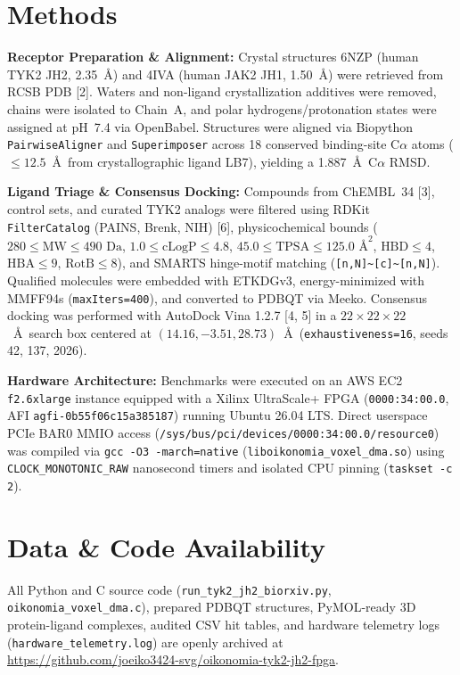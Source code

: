 \documentclass[10pt,letterpaper]{article}
\begin{document}
\section{Methods}
\textbf{Receptor Preparation \& Alignment:} Crystal structures 6NZP (human TYK2 JH2, 2.35~Å) and 4IVA (human JAK2 JH1, 1.50~Å) were retrieved from RCSB PDB [2]. Waters and non-ligand crystallization additives were removed, chains were isolated to Chain~A, and polar hydrogens/protonation states were assigned at pH~7.4 via OpenBabel. Structures were aligned via Biopython \texttt{PairwiseAligner} and \texttt{Superimposer} across 18 conserved binding-site C$\alpha$ atoms ($\le 12.5$~Å\ from crystallographic ligand LB7), yielding a 1.887~Å\ C$\alpha$ RMSD.

\textbf{Ligand Triage \& Consensus Docking:} Compounds from ChEMBL~34 [3], control sets, and curated TYK2 analogs were filtered using RDKit \texttt{FilterCatalog} (PAINS, Brenk, NIH) [6], physicochemical bounds ($280 \le \text{MW} \le 490\text{ Da}$, $1.0 \le \text{cLogP} \le 4.8$, $45.0 \le \text{TPSA} \le 125.0\text{ Å}^2$, $\text{HBD} \le 4$, $\text{HBA} \le 9$, $\text{RotB} \le 8$), and SMARTS hinge-motif matching (\texttt{[n,N]\textasciitilde[c]\textasciitilde[n,N]}). Qualified molecules were embedded with ETKDGv3, energy-minimized with MMFF94s (\texttt{maxIters=400}), and converted to PDBQT via Meeko. Consensus docking was performed with AutoDock Vina 1.2.7 [4, 5] in a $22\times22\times22$~Å\ search box centered at $(14.16, -3.51, 28.73)$~Å\ (\texttt{exhaustiveness=16}, seeds 42, 137, 2026).

\textbf{Hardware Architecture:} Benchmarks were executed on an AWS EC2 \texttt{f2.6xlarge} instance equipped with a Xilinx UltraScale+ FPGA (\texttt{0000:34:00.0}, AFI \texttt{agfi-0b55f06c15a385187}) running Ubuntu 26.04 LTS. Direct userspace PCIe BAR0 MMIO access (\texttt{/sys/bus/pci/devices/0000:34:00.0/resource0}) was compiled via \texttt{gcc -O3 -march=native} (\texttt{liboikonomia\_voxel\_dma.so}) using \texttt{CLOCK\_MONOTONIC\_RAW} nanosecond timers and isolated CPU pinning (\texttt{taskset -c 2}).

\section{Data \& Code Availability}
All Python and C source code (\texttt{run\_tyk2\_jh2\_biorxiv.py}, \texttt{oikonomia\_voxel\_dma.c}), prepared PDBQT structures, PyMOL-ready 3D protein-ligand complexes, audited CSV hit tables, and hardware telemetry logs (\texttt{hardware\_telemetry.log}) are openly archived at \url{https://github.com/joeiko3424-svg/oikonomia-tyk2-jh2-fpga}.
\end{document}
